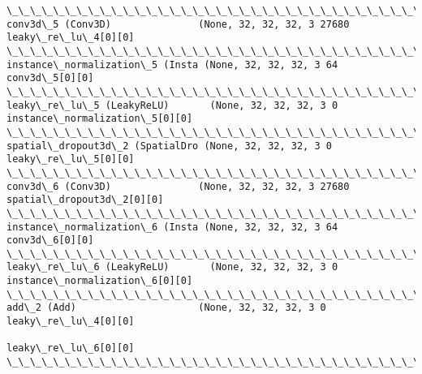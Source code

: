 \documentclass[11pt]{article}
\begin{document}
\begin{Verbatim}[commandchars=\\\{\}]
\_\_\_\_\_\_\_\_\_\_\_\_\_\_\_\_\_\_\_\_\_\_\_\_\_\_\_\_\_\_\_\_\_\_\_\_\_\_\_\_\_\_\_\_\_\_\_\_\_\_\_\_\_\_\_\_\_\_\_\_\_\_\_\_\_\_\_\_\_\_\_\_\_\_\_\_\_\_\_\_\_\_\_\_\_\_\_\_\_\_\_\_\_\_\_\_\_\_
conv3d\_5 (Conv3D)               (None, 32, 32, 32, 3 27680       leaky\_re\_lu\_4[0][0]              
\_\_\_\_\_\_\_\_\_\_\_\_\_\_\_\_\_\_\_\_\_\_\_\_\_\_\_\_\_\_\_\_\_\_\_\_\_\_\_\_\_\_\_\_\_\_\_\_\_\_\_\_\_\_\_\_\_\_\_\_\_\_\_\_\_\_\_\_\_\_\_\_\_\_\_\_\_\_\_\_\_\_\_\_\_\_\_\_\_\_\_\_\_\_\_\_\_\_
instance\_normalization\_5 (Insta (None, 32, 32, 32, 3 64          conv3d\_5[0][0]                   
\_\_\_\_\_\_\_\_\_\_\_\_\_\_\_\_\_\_\_\_\_\_\_\_\_\_\_\_\_\_\_\_\_\_\_\_\_\_\_\_\_\_\_\_\_\_\_\_\_\_\_\_\_\_\_\_\_\_\_\_\_\_\_\_\_\_\_\_\_\_\_\_\_\_\_\_\_\_\_\_\_\_\_\_\_\_\_\_\_\_\_\_\_\_\_\_\_\_
leaky\_re\_lu\_5 (LeakyReLU)       (None, 32, 32, 32, 3 0           instance\_normalization\_5[0][0]   
\_\_\_\_\_\_\_\_\_\_\_\_\_\_\_\_\_\_\_\_\_\_\_\_\_\_\_\_\_\_\_\_\_\_\_\_\_\_\_\_\_\_\_\_\_\_\_\_\_\_\_\_\_\_\_\_\_\_\_\_\_\_\_\_\_\_\_\_\_\_\_\_\_\_\_\_\_\_\_\_\_\_\_\_\_\_\_\_\_\_\_\_\_\_\_\_\_\_
spatial\_dropout3d\_2 (SpatialDro (None, 32, 32, 32, 3 0           leaky\_re\_lu\_5[0][0]              
\_\_\_\_\_\_\_\_\_\_\_\_\_\_\_\_\_\_\_\_\_\_\_\_\_\_\_\_\_\_\_\_\_\_\_\_\_\_\_\_\_\_\_\_\_\_\_\_\_\_\_\_\_\_\_\_\_\_\_\_\_\_\_\_\_\_\_\_\_\_\_\_\_\_\_\_\_\_\_\_\_\_\_\_\_\_\_\_\_\_\_\_\_\_\_\_\_\_
conv3d\_6 (Conv3D)               (None, 32, 32, 32, 3 27680       spatial\_dropout3d\_2[0][0]        
\_\_\_\_\_\_\_\_\_\_\_\_\_\_\_\_\_\_\_\_\_\_\_\_\_\_\_\_\_\_\_\_\_\_\_\_\_\_\_\_\_\_\_\_\_\_\_\_\_\_\_\_\_\_\_\_\_\_\_\_\_\_\_\_\_\_\_\_\_\_\_\_\_\_\_\_\_\_\_\_\_\_\_\_\_\_\_\_\_\_\_\_\_\_\_\_\_\_
instance\_normalization\_6 (Insta (None, 32, 32, 32, 3 64          conv3d\_6[0][0]                   
\_\_\_\_\_\_\_\_\_\_\_\_\_\_\_\_\_\_\_\_\_\_\_\_\_\_\_\_\_\_\_\_\_\_\_\_\_\_\_\_\_\_\_\_\_\_\_\_\_\_\_\_\_\_\_\_\_\_\_\_\_\_\_\_\_\_\_\_\_\_\_\_\_\_\_\_\_\_\_\_\_\_\_\_\_\_\_\_\_\_\_\_\_\_\_\_\_\_
leaky\_re\_lu\_6 (LeakyReLU)       (None, 32, 32, 32, 3 0           instance\_normalization\_6[0][0]   
\_\_\_\_\_\_\_\_\_\_\_\_\_\_\_\_\_\_\_\_\_\_\_\_\_\_\_\_\_\_\_\_\_\_\_\_\_\_\_\_\_\_\_\_\_\_\_\_\_\_\_\_\_\_\_\_\_\_\_\_\_\_\_\_\_\_\_\_\_\_\_\_\_\_\_\_\_\_\_\_\_\_\_\_\_\_\_\_\_\_\_\_\_\_\_\_\_\_
add\_2 (Add)                     (None, 32, 32, 32, 3 0           leaky\_re\_lu\_4[0][0]              
                                                                 leaky\_re\_lu\_6[0][0]              
\_\_\_\_\_\_\_\_\_\_\_\_\_\_\_\_\_\_\_\_\_\_\_\_\_\_\_\_\_\_\_\_\_\_\_\_\_\_\_\_\_\_\_\_\_\_\_\_\_\_\_\_\_\_\_\_\_\_\_\_\_\_\_\_\_\_\_\_\_\_\_\_\_\_\_\_\_\_\_\_\_\_\_\_\_\_\_\_\_\_\_\_\_\_\_\_\_\_

\end{Verbatim}
\end{document}

